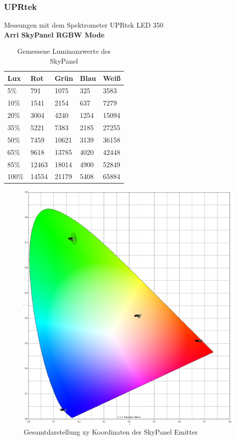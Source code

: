 \documentclass[11pt]{scrartcl}
\begin{document}
\subsubsection{UPRtek}
Messungen mit dem Spektrometer UPRtek LED 350\\
\textbf{Arri SkyPanel RGBW Mode}
\begin{table}[H]
    \begin{tabularx}{\textwidth}{|X|X|X|X|X|}
        \hline
        Lux   & Rot   & Grün  & Blau & Weiß \\\hline
        5\%   & 791   & 1075  & 325  & 3583 \\\hline
        10\%  & 1541  & 2154  & 637  & 7279 \\\hline
        20\%  & 3004  & 4240  & 1254 & 15094\\\hline
        35\%  & 5221  & 7383  & 2185 & 27255\\\hline
        50\%  & 7459  & 10621 & 3139 & 36158\\\hline
        65\%  & 9618  & 13785 & 4020 & 42448\\\hline
        85\%  & 12463 & 18014 & 4900 & 52849\\\hline
        100\% & 14554 & 21179 & 5408 & 65884\\\hline
    \end{tabularx}
    \caption{Gemessene Luminanzwerte des SkyPanel} \label{table:luxSkypanel}
\end{table}
\noindent
\begin{figure}[H]
    \begin{center}
        \includegraphics[width=\textwidth]{images/macAdam/skypanelTotal.png}
    \end{center}
    \caption{Gesamtdarstellung xy Koordinaten der SkyPanel Emitter}
\end{figure}
\end{document}
